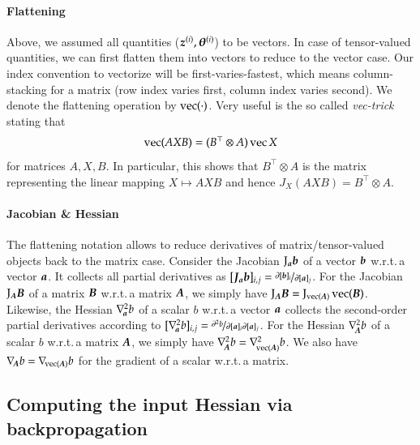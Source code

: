 
\paragraph{Flattening} Above, we assumed all quantities (${\boldsymbol{z}}^{(i)}, {\boldsymbol{\theta}}^{(i)}$) to be vectors.
In case of tensor-valued quantities, we can first flatten them into vectors to reduce to the vector case.
Our index convention to vectorize will be first-varies-fastest, which means column-stacking for a matrix (row index varies first, column index varies second).
We denote the flattening operation by $\operatorname{vec}(\cdot)$.
Very useful is the so called \emph{vec-trick} stating that 
\begin{equation}\label{eq:vecTrick}
    \operatorname{vec}(AXB) = (B^\top\otimes A)\operatorname{vec}{X}
\end{equation}
for matrices $A, X, B$. In particular, this shows that $B^\top\otimes A$ is the  matrix representing the linear mapping $X\mapsto AXB$ and hence $J_X(AXB) = B^\top\otimes A$. 

\paragraph{Jacobian \& Hessian} The flattening notation allows to reduce derivatives of matrix/tensor-valued objects back to the matrix case.
Consider the Jacobian $\mathrm{J}_{{\boldsymbol{a}}}{\boldsymbol{b}}$ of a vector ${\boldsymbol{b}}$ w.r.t.\,a vector ${\boldsymbol{a}}$.
It collects all partial derivatives as $[{\boldsymbol{J}}_{{\boldsymbol{a}}}{\boldsymbol{b}}]_{i,j} = \nicefrac{\partial [{\boldsymbol{b}}]_i}{\partial [{\boldsymbol{a}}]_j}$.
For the Jacobian $\mathrm{J}_{{\boldsymbol{A}}}{\boldsymbol{B}}$ of a matrix ${\boldsymbol{B}}$ w.r.t.\,a matrix ${\boldsymbol{A}}$, we simply have $\mathrm{J}_{{\boldsymbol{A}}} {\boldsymbol{B}} = \mathrm{J}_{\operatorname{vec}( {\boldsymbol{A}} )}\operatorname{vec}({\boldsymbol{B}})$.
Likewise, the Hessian $\nabla_{\!{{\boldsymbol{a}}}}^{2}b$ of a scalar $b$ w.r.t.\,a vector ${\boldsymbol{a}}$ collects the second-order partial derivatives according to $[\nabla_{\!{{\boldsymbol{a}}}}^{2}b]_{i,j} = \nicefrac{\partial^2 b}{\partial [{\boldsymbol{a}}]_i \partial [{\boldsymbol{a}}]_j}$.
For the Hessian $\nabla_{\!{{\boldsymbol{A}}}}^{2} b$ of a scalar $b$ w.r.t.\,a matrix ${\boldsymbol{A}}$, we simply have $\nabla_{\!{{\boldsymbol{A}}}}^{2} b = \nabla_{\!{\operatorname{vec}({\boldsymbol{A}})}}^{2}b$.
We also have $\nabla_{\!{{\boldsymbol{A}}}} b = \nabla_{\!{\operatorname{vec}({\boldsymbol{A}})}} b$ for the gradient of a scalar w.r.t.\,a matrix.

\subsection{Computing the input Hessian via backpropagation}

